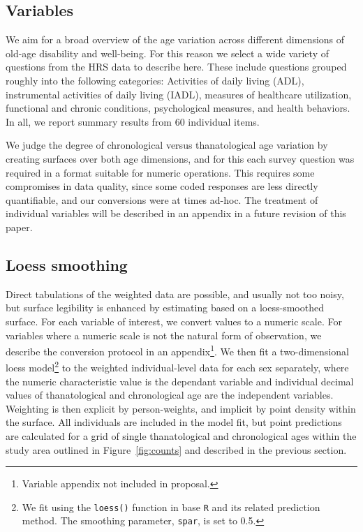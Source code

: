 \documentclass{article}
\begin{document}
\subsection{Variables}
We aim for a broad overview of the age variation across different dimensions of
old-age disability and well-being. For this reason we select a wide variety of
questions from the HRS data to describe here. These include questions
grouped roughly into the following categories: Activities of daily living (ADL),
instrumental activities of daily living (IADL), measures of healthcare utilization, functional and chronic conditions, psychological
measures, and health behaviors. In all, we report summary results from 60
individual items.

We judge the degree of chronological versus thanatological age variation by
creating surfaces over both age dimensions, and for this each survey question
was required in a format suitable for numeric operations. This requires some
compromises in data quality, since some coded responses are less directly
quantifiable, and our conversions were at times ad-hoc. The treatment of
individual variables will be described in an appendix in a future
revision of this paper.

\subsection{Loess smoothing}
Direct tabulations of the weighted data are possible, and usually not too noisy,
but surface legibility is enhanced by estimating based on a loess-smoothed
surface. For each variable of interest, we convert values to a numeric scale.
For variables where a numeric scale is not the natural form of observation, we
describe the conversion protocol in an appendix\footnote{Variable appendix not
included in proposal.}. We then fit a two-dimensional loess model\footnote{We
fit using the \texttt{loess()} function in base \texttt{R}
\citep{cleveland1992local,Rcore2013} and its related prediction method. The
smoothing parameter, \texttt{spar}, is set to 0.5.} to the weighted
individual-level data for each sex separately, where the numeric characteristic value is the dependant variable and individual decimal values of thanatological and chronological age are the independent variables.
Weighting is then explicit by person-weights, and implicit by point density
within the surface. All individuals are included in the model fit, but point
predictions are calculated for a grid of single thanatological and chronological
ages within the study area outlined in Figure~\ref{fig:counts} and described in
the previous section. 
\end{document}
